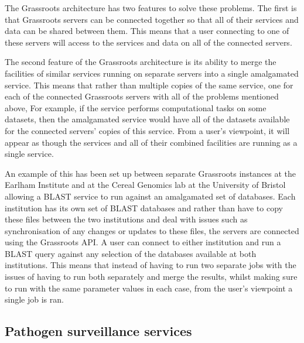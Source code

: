 \documentclass[9pt,a4paper]{extarticle}
\begin{document}
The Grassroots architecture has two features to solve these problems. 
The first is that Grassroots servers can be connected together so that all of their services and data can be shared between them. 
This means that a user connecting to one of these servers will access to the services and data on all of the connected servers.

The second feature of the Grassroots architecture is its ability to merge the facilities of similar services running on separate servers into a single amalgamated service. 
This means that rather than multiple copies of the same service, one for each of the connected Grassroots servers with all of the problems mentioned above, 
For example, if the service performs computational tasks on some datasets, then the amalgamated service would have all of the datasets available for the connected servers' copies of this service.
From a user’s viewpoint, it will appear as though the services and all of their combined facilities are running as a single service. 

An example of this has been set up between separate Grassroots instances at the Earlham Institute and at the Cereal Genomics lab at the University of Bristol allowing a BLAST service to run against an amalgamated set of databases. 
Each institution has its own set of BLAST databases and rather than have to copy these files between the two institutions and deal with issues such as synchronisation of any changes or updates to these files, the servers are connected using the Grassroots API. 
A user can connect to either institution and run a BLAST query against any selection of the databases available at both institutions. 
This means that instead of having to run two separate jobs with the issues of having to run both separately and merge the results, whilst making sure to run with the same parameter values in each case, from the user's viewpoint a single job is ran.


\subsection*{Pathogen surveillance services}
\end{document}
